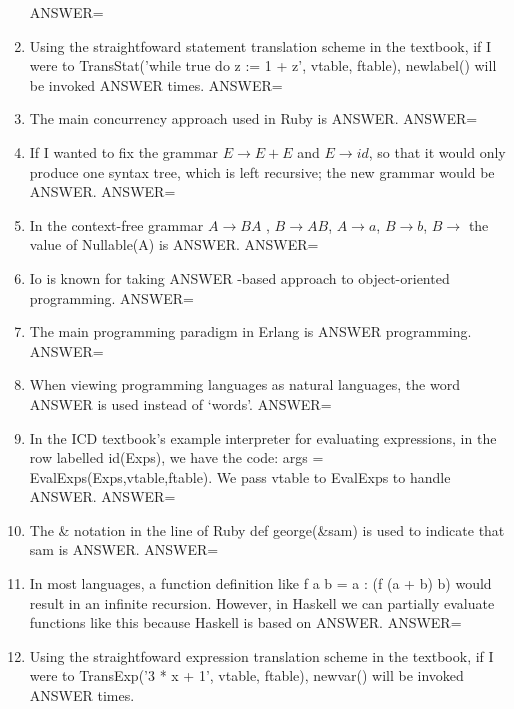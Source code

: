 \documentclass{exam}
\begin{document}
\begin{enumerate}
ANSWER=
\item Using the straightfoward statement translation scheme in the textbook, if I were to TransStat('while true do z := 1 + z', vtable, ftable), newlabel() will be invoked ANSWER times.\newline
ANSWER=
\item The main concurrency approach used in Ruby is ANSWER.\newline
ANSWER=
\item If I wanted to fix the grammar $E \rightarrow E + E$ and $E \rightarrow id$, so that it would only produce one syntax tree, which is left recursive; the new grammar would be ANSWER.\newline
ANSWER=
\item In the context-free grammar $A \rightarrow B A$ , $B \rightarrow A B$, $A \rightarrow a$, $B \rightarrow b$, $B \rightarrow$  the value of Nullable(A) is ANSWER.\newline
ANSWER=
\item Io is known for taking ANSWER -based approach to object-oriented programming.\newline
ANSWER=
\item The main programming paradigm in Erlang is ANSWER programming.\newline
ANSWER=
\item When viewing programming languages as natural languages, the word ANSWER is used instead of `words'.\newline
ANSWER=
\item In the ICD textbook's example interpreter for evaluating expressions, in the row labelled id(Exps), we have the code: args = EvalExps(Exps,vtable,ftable).  We pass vtable to EvalExps to handle ANSWER.\newline
ANSWER=
\item The \& notation in the line of Ruby def george(\&sam) is used to indicate that sam is ANSWER.\newline
ANSWER=
\item In most languages, a function definition like f a b = a : (f (a + b) b) would result in an infinite recursion.  However, in Haskell we can partially evaluate functions like this because Haskell is based on ANSWER.\newline
ANSWER=
\item Using the straightfoward expression translation scheme in the textbook, if I were to TransExp('3 * x + 1', vtable, ftable), newvar() will be invoked ANSWER times.\newline

\end{enumerate}
\end{document}
